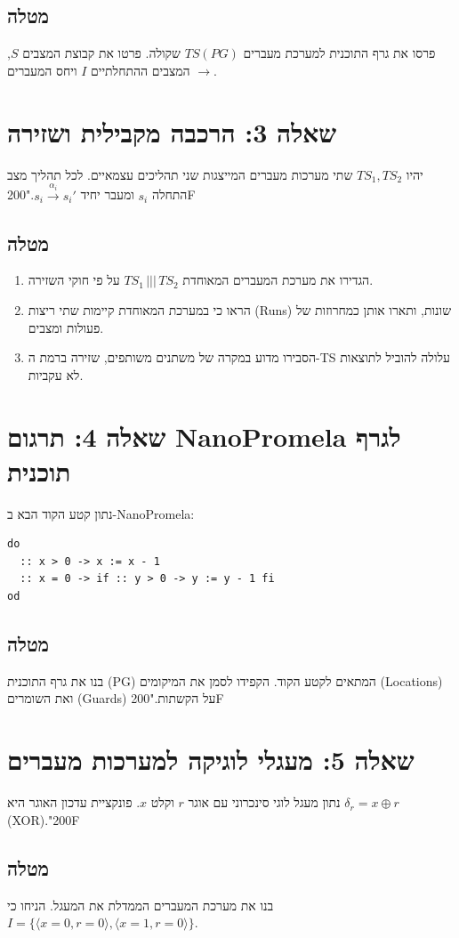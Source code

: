 \documentclass[11pt,a4paper]{article}
\newcommand{\RLM}{\char"200F}
\begin{document}
\subsection{מטלה}
פרסו את גרף התוכנית למערכת מעברים $TS(PG)$ שקולה. פרטו את קבוצת המצבים $S$, המצבים ההתחלתיים $I$ ויחס המעברים $\to$.

\section{שאלה 3: הרכבה מקבילית ושזירה}
יהיו $TS_1, TS_2$ שתי מערכות מעברים המייצגות שני תהליכים עצמאיים. לכל תהליך מצב התחלה $s_i$ ומעבר יחיד $s_i \xrightarrow{\alpha_i} s_i'$.\RLM

\subsection{מטלה}
\begin{enumerate}
    \item הגדירו את מערכת המעברים המאוחדת $TS_1 \,|||\, TS_2$ על פי חוקי השזירה.
    \item הראו כי במערכת המאוחדת קיימות שתי ריצות (Runs) שונות, ותארו אותן כמחרוזות של פעולות ומצבים.
    \item הסבירו מדוע במקרה של משתנים משותפים, שזירה ברמת ה-TS עלולה להוביל לתוצאות לא עקביות.
\end{enumerate}

\section{שאלה 4: תרגום NanoPromela לגרף תוכנית}
נתון קטע הקוד הבא ב-NanoPromela:
\begin{lstlisting}
do
  :: x > 0 -> x := x - 1
  :: x = 0 -> if :: y > 0 -> y := y - 1 fi
od
\end{lstlisting}

\subsection{מטלה}
בנו את גרף התוכנית (PG) המתאים לקטע הקוד. הקפידו לסמן את המיקומים \textenglish{(Locations)} ואת השומרים \textenglish{(Guards)} על הקשתות.\RLM

\section{שאלה 5: מעגלי לוגיקה למערכות מעברים}
נתון מעגל לוגי סינכרוני עם אוגר $r$ וקלט $x$. פונקציית עדכון האוגר היא $\delta_r = x \oplus r$ \textenglish{(XOR)}.\RLM

\subsection{מטלה}
בנו את מערכת המעברים הממדלת את המעגל. הניחו כי $I = \{ \langle x=0, r=0 \rangle, \langle x=1, r=0 \rangle \}$.
\end{document}
